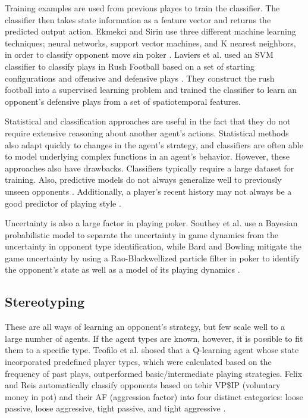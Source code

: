 \documentclass{aamas2014}
\begin{document}
Training examples are used from previous playes to train the classifier. The classifier then takes state information as a feature vector and returns the predicted output action. Ekmekci and Sirin use three different machine learning techniques; neural networks, support vector machines, and K nearest neighbors, in order to classify opponent move sin poker \cite{Ekmekci}. Laviers et al. used an SVM classifier to classify plays in Rush Football based on a set of starting configurations and offensive and defensive plays \cite{Laviers}. They construct the rush football into a supervised learning problem and trained the classifier to learn an opponent's defensive plays from a set of spatiotemporal features.

Statistical and classification approaches are useful in the fact that they do not require extensive reasoning about another agent's actions. Statistical methods also adapt quickly to changes in the agent's strategy, and classifiers are often able to model underlying complex functions in an agent's behavior. However, these approaches also have drawbacks. Classifiers typically require a large dataset for training. Also, predictive models do not always generalize well to previously unseen opponents \cite{predictivemodels}. Additionally, a player's recent history may not always be a good predictor of playing style \cite{playingstyle}.

Uncertainty is also a large factor in playing poker. Southey et al. use a Bayesian probabilistic model to separate the uncertainty in game dynamics from the uncertainty in opponent type identification, while Bard and Bowling mitigate the game uncertainty by using a Rao-Blackwellized particle filter in poker to identify the opponent's state as well as a model of its playing dynamics \cite{Southey}.


\subsection{Stereotyping}
\label{sec:stereotyping}

These are all ways of learning an opponent's strategy, but few scale well to a large number of agents. If the agent types are known, however, it is possible to fit them to a specific type. Teofilo et al. shosed that a Q-learning agent whose state incorporated predefined player types, which were calculated based on the frequency of past plays, outperformed basic/intermediate playing strategies. Felix and Reis automatically classify opponents based on tehir VP\$IP (voluntary money in pot) and their AF (aggression factor) into four distinct categories: loose passive, loose aggressive, tight passive, and tight aggressive \cite{Teofilo}.
\end{document}

